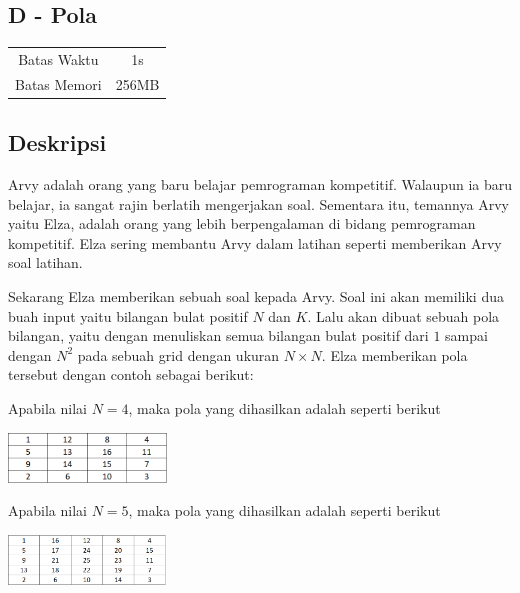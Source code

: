 \documentclass{article}
\begin{document}
\begin{center}
    \section*{D - Pola} %

    \begin{tabular}{ | c c | }
        \hline
        Batas Waktu  & 1s \\    %
        Batas Memori & 256MB \\  %
        \hline
    \end{tabular}
\end{center}

\subsection*{Deskripsi}

Arvy adalah orang yang baru belajar pemrograman kompetitif. Walaupun ia  baru belajar, ia sangat rajin berlatih
mengerjakan soal. Sementara itu, temannya Arvy yaitu Elza, adalah orang yang lebih berpengalaman di bidang pemrograman kompetitif. 
Elza sering membantu Arvy dalam latihan seperti memberikan Arvy soal latihan.

Sekarang Elza memberikan sebuah soal kepada Arvy. Soal ini akan memiliki dua buah input yaitu bilangan bulat positif $N$ dan $K$. 
Lalu akan dibuat sebuah pola bilangan, yaitu dengan menuliskan semua bilangan bulat positif dari $1$ sampai dengan $N^2$ pada sebuah 
grid dengan ukuran $N \times N$. Elza memberikan pola tersebut dengan contoh sebagai berikut:

Apabila nilai $N = 4$, maka pola yang dihasilkan adalah seperti berikut
\begin{center}
    \includegraphics[height=50px]{n=4}
\end{center}

Apabila nilai $N = 5$, maka pola yang dihasilkan adalah seperti berikut
\begin{center}
    \includegraphics[height=50px]{n=5}
\end{center}
\end{document}
